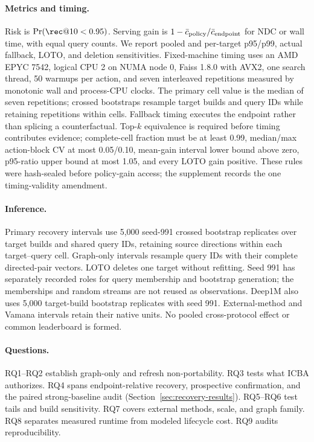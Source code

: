 \paragraph{Metrics and timing.}
Risk is $\Pr(\rec@10<0.95)$. Serving gain is $1-\bar c_{\rm policy}/\bar c_{\rm endpoint}$ for NDC or wall time, with equal query counts. We report pooled and per-target p95/p99, actual fallback, LOTO, and deletion sensitivities. Fixed-machine timing uses an AMD EPYC 7542, logical CPU 2 on NUMA node 0, Faiss 1.8.0 with AVX2, one search thread, 50 warmups per action, and seven interleaved repetitions measured by monotonic wall and process-CPU clocks. The primary cell value is the median of seven repetitions; crossed bootstraps resample target builds and query IDs while retaining repetitions within cells. Fallback timing executes the endpoint rather than splicing a counterfactual. Top-$k$ equivalence is required before timing contributes evidence; complete-cell fraction must be at least 0.99, median/max action-block CV at most 0.05/0.10, mean-gain interval lower bound above zero, p95-ratio upper bound at most 1.05, and every LOTO gain positive. These rules were hash-sealed before policy-gain access; the supplement records the one timing-validity amendment.

\paragraph{Inference.}
Primary recovery intervals use 5,000 seed-991 crossed bootstrap replicates over target builds and shared query IDs, retaining source directions within each target--query cell. Graph-only intervals resample query IDs with their complete directed-pair vectors. LOTO deletes one target without refitting. Seed 991 has separately recorded roles for query membership and bootstrap generation; the memberships and random streams are not reused as observations. Deep1M also uses 5,000 target-build bootstrap replicates with seed 991. External-method and Vamana intervals retain their native units. No pooled cross-protocol effect or common leaderboard is formed.

\paragraph{Questions.}
RQ1--RQ2 establish graph-only and refresh non-portability. RQ3 tests what ICBA authorizes. RQ4 spans endpoint-relative recovery, prospective confirmation, and the paired strong-baseline audit (Section~\ref{sec:recovery-results}). RQ5--RQ6 test tails and build sensitivity. RQ7 covers external methods, scale, and graph family. RQ8 separates measured runtime from modeled lifecycle cost. RQ9 audits reproducibility.
